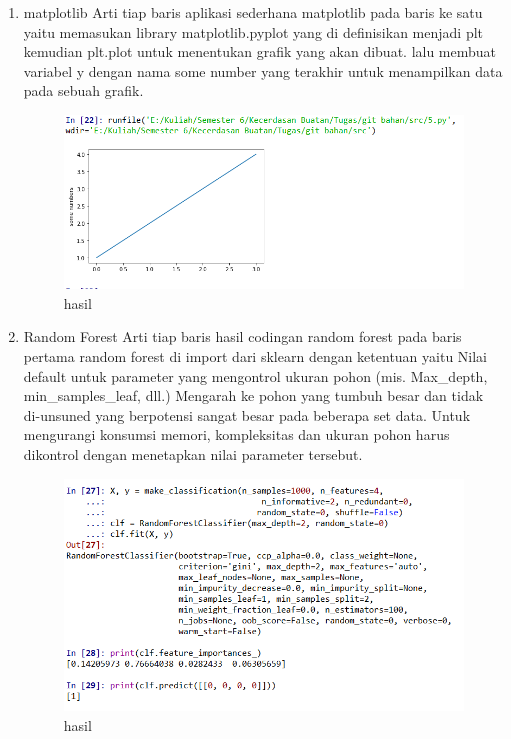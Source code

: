 \begin{enumerate}
\item matplotlib
Arti tiap baris aplikasi sederhana matplotlib pada baris ke satu yaitu memasukan library matplotlib.pyplot yang di definisikan menjadi plt kemudian plt.plot untuk menentukan grafik yang akan dibuat. lalu membuat variabel y dengan nama some number yang terakhir untuk menampilkan data pada sebuah grafik.

\begin{figure}[ht]
\centering
\includegraphics[scale=0.5]{figures/1174003/3/5.PNG}
\caption{hasil}
\label{contoh}
\end{figure}

\item Random Forest
Arti tiap baris hasil codingan random forest pada baris pertama random forest di import dari sklearn dengan ketentuan yaitu Nilai default untuk parameter yang mengontrol ukuran pohon (mis. Max\_depth, min\_samples\_leaf, dll.) Mengarah ke pohon yang tumbuh besar dan tidak di-unsuned yang berpotensi sangat besar pada beberapa set data. Untuk mengurangi konsumsi memori, kompleksitas dan ukuran pohon harus dikontrol dengan menetapkan nilai parameter tersebut.

\begin{figure}[ht]
\centering
\includegraphics[scale=0.5]{figures/1174003/3/7.PNG}
\caption{hasil}
\label{contoh}
\end{figure}


\end{enumerate}
